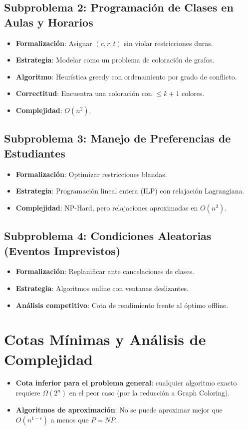 \documentclass[12pt, a4paper]{article}
\begin{document}
\subsection{Subproblema 2: Programación de Clases en Aulas y Horarios}
\begin{itemize}
    \item \textbf{Formalización}: Asignar \( (c, r, t) \) sin violar restricciones duras.
    \item \textbf{Estrategia}: Modelar como un problema de coloración de grafos.
    \item \textbf{Algoritmo}: Heurística greedy con ordenamiento por grado de conflicto.
    \item \textbf{Correctitud}: Encuentra una coloración con \( \leq k+1 \) colores.
    \item \textbf{Complejidad}: \( O(n^2) \).
\end{itemize}

\subsection{Subproblema 3: Manejo de Preferencias de Estudiantes}
\begin{itemize}
    \item \textbf{Formalización}: Optimizar restricciones blandas.
    \item \textbf{Estrategia}: Programación lineal entera (ILP) con relajación Lagrangiana.
    \item \textbf{Complejidad}: NP-Hard, pero relajaciones aproximadas en \( O(n^3) \).
\end{itemize}

\subsection{Subproblema 4: Condiciones Aleatorias (Eventos Imprevistos)}
\begin{itemize}
    \item \textbf{Formalización}: Replanificar ante cancelaciones de clases.
    \item \textbf{Estrategia}: Algoritmos online con ventanas deslizantes.
    \item \textbf{Análisis competitivo}: Cota de rendimiento frente al óptimo offline.
\end{itemize}

\section{Cotas Mínimas y Análisis de Complejidad}
\begin{itemize}
    \item \textbf{Cota inferior para el problema general}: cualquier algoritmo exacto requiere \( \Omega(2^n) \) en el peor caso (por la reducción a Graph Coloring).
    \item \textbf{Algoritmos de aproximación}: No se puede aproximar mejor que \( O(n^{1-\epsilon}) \) a menos que \( P = NP \).
\end{itemize}
\end{document}
